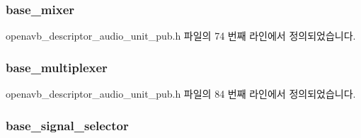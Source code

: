 \subsubsection[{\texorpdfstring{base\+\_\+mixer}{base_mixer}}]{ base\+\_\+mixer}\hypertarget{structopenavb__aem__descriptor__audio__unit__t_ab6928064cbf2d27e040ad7f707a569c8}{}\label{structopenavb__aem__descriptor__audio__unit__t_ab6928064cbf2d27e040ad7f707a569c8}


openavb\+\_\+descriptor\+\_\+audio\+\_\+unit\+\_\+pub.\+h 파일의 74 번째 라인에서 정의되었습니다.

\subsubsection[{\texorpdfstring{base\+\_\+multiplexer}{base_multiplexer}}]{ base\+\_\+multiplexer}\hypertarget{structopenavb__aem__descriptor__audio__unit__t_a4dfa22925c6dc4f0b13763242badebc5}{}\label{structopenavb__aem__descriptor__audio__unit__t_a4dfa22925c6dc4f0b13763242badebc5}


openavb\+\_\+descriptor\+\_\+audio\+\_\+unit\+\_\+pub.\+h 파일의 84 번째 라인에서 정의되었습니다.

\subsubsection[{\texorpdfstring{base\+\_\+signal\+\_\+selector}{base_signal_selector}}]{ base\+\_\+signal\+\_\+selector}\hypertarget{structopenavb__aem__descriptor__audio__unit__t_ac2894c9d83c1cc7ef8d9221b84911351}{}\label{structopenavb__aem__descriptor__audio__unit__t_ac2894c9d83c1cc7ef8d9221b84911351}


